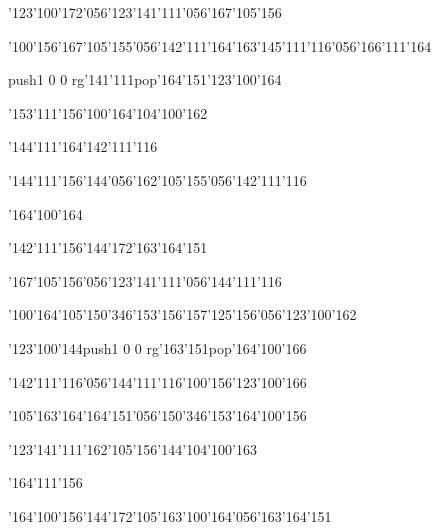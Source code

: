 \null\vfill\ipa\centerline{\enskip\char'123\char'100\char'172\char'056\char'123\char'141\char'111\char'056\char'167\char'105\char'156}\medskip\centerline{\enskip\char'100\char'156\enskip\enskip\enskip\char'167\char'105\char'155\char'056\char'142\char'111\char'164\enskip\char'163\char'145\char'111\char'116\char'056\char'166\char'111\char'164}\medskip\centerline{\enskip\enskip\enskip\enskip\enskip\pdfcolorstack\match push{1 0 0 rg}\char'141\char'111\pdfcolorstack\match pop{}\enskip\enskip\enskip\enskip\char'164\char'151\enskip\char'123\char'100\char'164}\medskip\centerline{\enskip\char'153\char'111\char'156\enskip\enskip\enskip\enskip\enskip\char'100\char'164\enskip\enskip\enskip\char'104\char'100\char'162}\medskip\centerline{\enskip\enskip\enskip\enskip\enskip\enskip\enskip\char'144\char'111\char'164\enskip\char'142\char'111\char'116}\medskip\centerline{\enskip\enskip\enskip\enskip\enskip\char'144\char'111\char'156\char'144\char'056\char'162\char'105\char'155\char'056\char'142\char'111\char'116}\medskip\centerline{\enskip\enskip\enskip\enskip\enskip\enskip\enskip\enskip\enskip\enskip\enskip\char'164\char'100\char'164}\medskip\centerline{\enskip\enskip\enskip\enskip\enskip\char'142\char'111\char'156\char'144\char'172\enskip\enskip\enskip\enskip\enskip\enskip\char'163\char'164\char'151}\medskip\vfill\footline{\hfil\tt\folio\hfil}\eject
\null\vfill\ipa\centerline{\enskip\char'167\char'105\char'156\char'056\char'123\char'141\char'111\char'056\char'144\char'111\char'116}\medskip\centerline{\enskip\char'100\char'164\enskip\char'105\enskip\enskip\enskip\enskip\char'150\char'346\char'153\enskip\char'156\char'157\char'125\char'156\char'056\char'123\char'100\char'162}\medskip\centerline{\enskip\char'123\char'100\char'144\enskip\enskip\enskip\enskip\pdfcolorstack\match push{1 0 0 rg}\char'163\char'151\pdfcolorstack\match pop{}\enskip\enskip\enskip\enskip\char'164\char'100\char'166}\medskip\centerline{\enskip\char'142\char'111\char'116\char'056\char'144\char'111\char'116\enskip\char'100\char'156\enskip\enskip\enskip\char'123\char'100\char'166}\medskip\centerline{\enskip\char'105\char'163\char'164\enskip\char'164\char'151\char'056\char'150\char'346\char'153\enskip\char'164\char'100\char'156}\medskip\centerline{\enskip\char'123\char'141\char'111\enskip\char'162\char'105\char'156\char'144\enskip\enskip\enskip\enskip\char'104\char'100\char'163}\medskip\centerline{\enskip\enskip\enskip\enskip\enskip\enskip\enskip\char'164\char'111\char'156\enskip\enskip\enskip\enskip}\medskip\centerline{\enskip\enskip\enskip\enskip\enskip\char'164\char'100\char'156\char'144\char'172\enskip\char'105\char'163\enskip\char'100\char'164\char'056\char'163\char'164\char'151}\medskip\vfill\footline{\hfil\tt\folio\hfil}\eject
